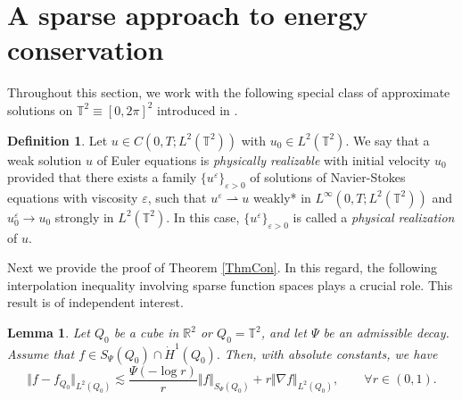 \documentclass[11pt, a4paper,leqno]{amsart}
\theoremstyle{plain}
\newtheorem{lemma}{Lemma}
\numberwithin{equation}{section}
\theoremstyle{definition}
\newtheorem{definition}{Definition}
\theoremstyle{remark}
\def\T{\mathbb{T}}
\begin{document}
\section{A sparse approach to energy conservation\label{sec:physically}}

Throughout this section, we work with the following special class of approximate solutions on $\mathbb{T}^2 \equiv [0, 2 \pi]^2$ introduced in \cite[Definition 3]{Ches}. 

\begin{definition}\label{DefVV}
	Let $u \in C(0, T; L^2(\T^2))$ with $u_0 \in L^2(\T^2)$. We say that a weak solution $u$ of Euler equations is  \emph{physically realizable} with initial velocity $u_0$ provided that there exists a family $\{u^\varepsilon\}_{\varepsilon > 0}$ of solutions of Navier-Stokes equations with viscosity $\varepsilon$, such that $u^\varepsilon \rightharpoonup u$ weakly* in $L^\infty(0, T; L^2(\T^2))$ and $u^\varepsilon_0 \to u_0$ strongly in $L^2(\T^2)$. In this case, $\{u^\varepsilon\}_{\varepsilon > 0}$ is called a \emph{physical realization} of $u$. 
\end{definition}

Next we provide the proof of Theorem \ref{ThmCon}. In this regard, the following interpolation inequality involving sparse function
spaces plays a crucial role. This result is of independent interest. 

\begin{lemma}
\label{LemmaInt} Let $Q_{0}$ be a cube in $\mathbb{R}^{2}$ or $Q_{0}%
=\mathbb{T}^{2}$, and let $\Psi$ be an admissible decay. Assume that $f\in S_{\Psi}(Q_{0})\cap\dot{H}^{1}%
(Q_{0}).$ Then, with absolute constants, we have
\begin{equation}
\Vert f-f_{Q_{0}}\Vert_{L^{2}(Q_{0})}\lesssim\frac{\Psi(-\log r)}{r}\Vert
f\Vert_{S_{\Psi}(Q_{0})}+r\Vert\nabla f\Vert_{L^{2}(Q_{0})}%
,\qquad\forall r\in(0,1).\label{IntIneqS}%
\end{equation}

\end{lemma}
\end{document}
